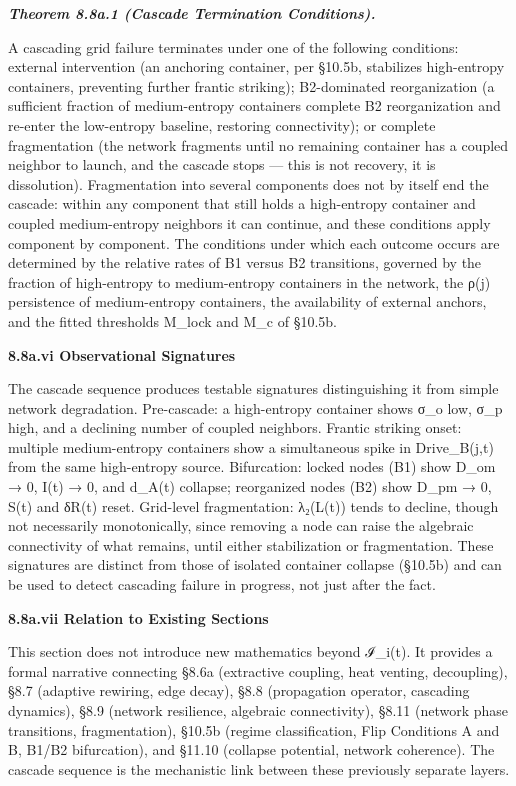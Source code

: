 \documentclass[
]{article}
\begin{document}
\emph{\textbf{Theorem 8.8a.1 (Cascade Termination Conditions).}}

A cascading grid failure terminates under one of the following
conditions: external intervention (an anchoring container, per §10.5b,
stabilizes high-entropy containers, preventing further frantic
striking); B2-dominated reorganization (a sufficient fraction of
medium-entropy containers complete B2 reorganization and re-enter the
low-entropy baseline, restoring connectivity); or complete fragmentation
(the network fragments until no remaining container has a coupled
neighbor to launch, and the cascade stops --- this is not recovery, it
is dissolution). Fragmentation into several components does not by
itself end the cascade: within any component that still holds a
high-entropy container and coupled medium-entropy neighbors it can
continue, and these conditions apply component by component. The
conditions under which each outcome occurs are determined by the
relative rates of B1 versus B2 transitions, governed by the fraction of
high-entropy to medium-entropy containers in the network, the ρ(j)
persistence of medium-entropy containers, the availability of external
anchors, and the fitted thresholds M\_lock and M\_c of §10.5b.

\textbf{8.8a.vi Observational Signatures}

The cascade sequence produces testable signatures distinguishing it from
simple network degradation. Pre-cascade: a high-entropy container shows
σ\_o low, σ\_p high, and a declining number of coupled neighbors.
Frantic striking onset: multiple medium-entropy containers show a
simultaneous spike in Drive\_B(j,t) from the same high-entropy source.
Bifurcation: locked nodes (B1) show D\_om → 0, I(t) → 0, and d\_A(t)
collapse; reorganized nodes (B2) show D\_pm → 0, S(t) and δR(t) reset.
Grid-level fragmentation: λ₂(L(t)) tends to decline, though not
necessarily monotonically, since removing a node can raise the algebraic
connectivity of what remains, until either stabilization or
fragmentation. These signatures are distinct from those of isolated
container collapse (§10.5b) and can be used to detect cascading failure
in progress, not just after the fact.

\textbf{8.8a.vii Relation to Existing Sections}

This section does not introduce new mathematics beyond ℐ\_i(t). It
provides a formal narrative connecting §8.6a (extractive coupling, heat
venting, decoupling), §8.7 (adaptive rewiring, edge decay), §8.8
(propagation operator, cascading dynamics), §8.9 (network resilience,
algebraic connectivity), §8.11 (network phase transitions,
fragmentation), §10.5b (regime classification, Flip Conditions A and B,
B1/B2 bifurcation), and §11.10 (collapse potential, network coherence).
The cascade sequence is the mechanistic link between these previously
separate layers.
\end{document}
